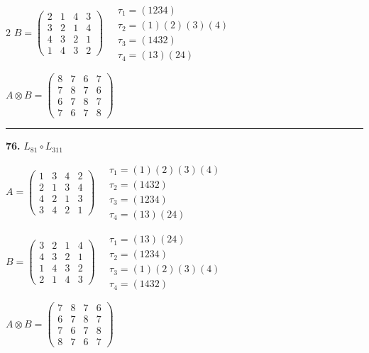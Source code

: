 \begin{multicols}{2}
$B = \begin{pmatrix} 2 & 1 & 4 & 3 \\ 3 & 2 & 1 & 4 \\ 4 & 3 & 2 & 1 \\ 1 & 4 & 3 & 2 \end{pmatrix} \quad \begin{matrix} \tau_{1}=(1 2 3 4) \\ \tau_{2}=(1)(2)(3)(4) \\ \tau_{3}=(1 4 3 2) \\ \tau_{4}=(1 3)(2 4) \end{matrix}$

$A \otimes B = \begin{pmatrix} 8 & 7 & 6 & 7 \\ 7 & 8 & 7 & 6 \\ 6 & 7 & 8 & 7 \\ 7 & 6 & 7 & 8 \end{pmatrix}$

\vspace{0.3em}
\hrule
\vspace{0.3em}

\noindent\textbf{76.} $L_{81} \circ L_{311}$

$A = \begin{pmatrix} 1 & 3 & 4 & 2 \\ 2 & 1 & 3 & 4 \\ 4 & 2 & 1 & 3 \\ 3 & 4 & 2 & 1 \end{pmatrix} \quad \begin{matrix} \tau_{1}=(1)(2)(3)(4) \\ \tau_{2}=(1 4 3 2) \\ \tau_{3}=(1 2 3 4) \\ \tau_{4}=(1 3)(2 4) \end{matrix}$

$B = \begin{pmatrix} 3 & 2 & 1 & 4 \\ 4 & 3 & 2 & 1 \\ 1 & 4 & 3 & 2 \\ 2 & 1 & 4 & 3 \end{pmatrix} \quad \begin{matrix} \tau_{1}=(1 3)(2 4) \\ \tau_{2}=(1 2 3 4) \\ \tau_{3}=(1)(2)(3)(4) \\ \tau_{4}=(1 4 3 2) \end{matrix}$

$A \otimes B = \begin{pmatrix} 7 & 8 & 7 & 6 \\ 6 & 7 & 8 & 7 \\ 7 & 6 & 7 & 8 \\ 8 & 7 & 6 & 7 \end{pmatrix}$


\end{multicols}
